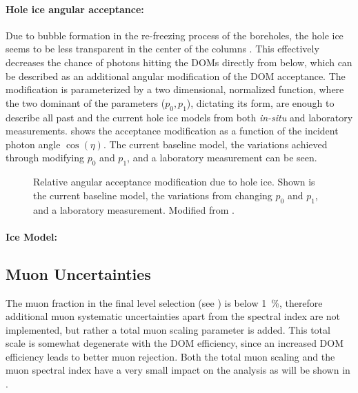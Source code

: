 \paragraph{Hole ice angular acceptance:}

Due to bubble formation in the re-freezing process of the boreholes, the hole ice seems to be less transparent in the center of the columns . This effectively decreases the chance of photons hitting the DOMs directly from below, which can be described as an additional angular modification of the DOM acceptance. The modification is parameterized by a two dimensional, normalized function, where the two dominant of the parameters ($p_0, p_1$), dictating its form, are enough to describe all past and the current hole ice models from both \textit{in-situ} and laboratory measurements.  shows the acceptance modification as a function of the incident photon angle $\cos(\eta)$. The current baseline model, the variations achieved through modifying $p_0$ and $p_1$, and a laboratory measurement can be seen.

\begin{figure}
    \centering
    
    \caption[Hole ice angular acceptance modification]{Relative angular acceptance modification due to hole ice. Shown is the current baseline model, the variations from changing $p_0$ and $p_1$, and a laboratory measurement. Modified from \cite{ATrettin_phd}.}
\end{figure}

\paragraph{Ice Model:}



\subsection{Muon Uncertainties}

The muon fraction in the final level selection (see ) is below \SI{1}{\percent}, therefore additional muon systematic uncertainties apart from the spectral index are not implemented, but rather a total muon scaling parameter is added. This total scale is somewhat degenerate with the DOM efficiency, since an increased DOM efficiency leads to better muon rejection. Both the total muon scaling and the muon spectral index have a very small impact on the analysis as will be shown in .
